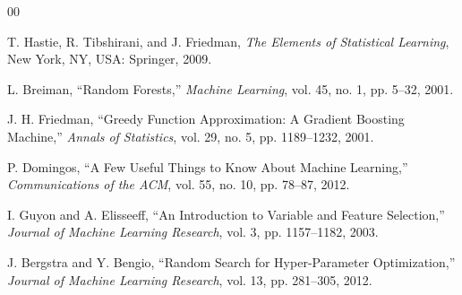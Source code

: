 \documentclass[conference]{IEEEtran}
\begin{document}
\begin{thebibliography}{00}

T. Hastie, R. Tibshirani, and J. Friedman,
\textit{The Elements of Statistical Learning},
New York, NY, USA: Springer, 2009.

L. Breiman,
``Random Forests,''
\textit{Machine Learning}, vol. 45, no. 1, pp. 5--32, 2001.

J. H. Friedman,
``Greedy Function Approximation: A Gradient Boosting Machine,''
\textit{Annals of Statistics}, vol. 29, no. 5, pp. 1189--1232, 2001.

P. Domingos,
``A Few Useful Things to Know About Machine Learning,''
\textit{Communications of the ACM}, vol. 55, no. 10, pp. 78--87, 2012.

I. Guyon and A. Elisseeff,
``An Introduction to Variable and Feature Selection,''
\textit{Journal of Machine Learning Research}, vol. 3, pp. 1157--1182, 2003.

J. Bergstra and Y. Bengio,
``Random Search for Hyper-Parameter Optimization,''
\textit{Journal of Machine Learning Research}, vol. 13, pp. 281--305, 2012.

\end{thebibliography}
\end{document}
